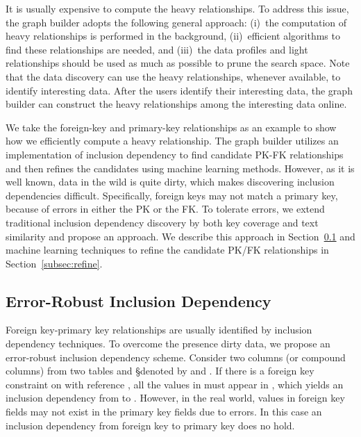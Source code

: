It is usually expensive to compute the heavy relationships. To address this
issue, the graph builder adopts the following general approach: 
(i)~the computation of heavy relationships is performed in the background, 
(ii)~efficient algorithms to find these relationships are needed, 
and (iii)~the data profiles and light relationships should be used as much as possible to prune the search space. 
Note that the data discovery can use the heavy
relationships, whenever available, to identify interesting data. After the
users identify their interesting data, the graph builder can construct the heavy
relationships among the interesting data online.

We take the foreign-key and primary-key relationships as an example to show how
we efficiently compute a heavy relationship. The graph builder utilizes an
implementation of inclusion dependency to find candidate PK-FK relationships and
then refines the candidates using machine learning methods. However,
as it is well known, data in the wild is quite dirty, which makes discovering
inclusion dependencies difficult. Specifically, foreign keys may not match a
primary key, because of errors in either the PK or the FK. To tolerate errors,
we extend traditional inclusion dependency discovery by both key coverage and
text similarity and propose an \emph{\eind} approach. 
We describe this approach in Section~\ref{subsec:eind} and machine learning
techniques to refine the candidate PK/FK relationships in Section~\ref{subsec:refine}.

\subsection{Error-Robust Inclusion Dependency}\label{subsec:eind}

Foreign key-primary key relationships are usually identified by inclusion
dependency techniques.  To overcome the presence  dirty data, we propose an error-robust
inclusion dependency scheme.
Consider two columns (or compound columns) from two tables \R and \S denoted by
\RX and \SY. If there is a foreign key constraint on \RX with reference \SY, all
the values in \RX must appear in \SY, which yields an inclusion dependency from
\RX to \SY. However, in the real world, values in foreign key fields may not
exist in the primary key fields due to errors.  In this case an inclusion
dependency from foreign key to primary key does no hold.

